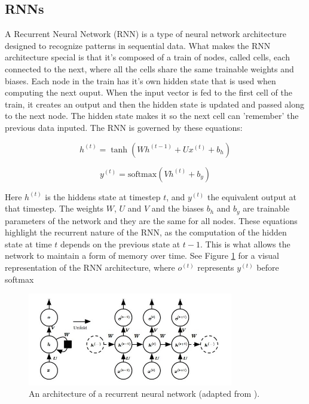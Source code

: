 \documentclass[11pt]{article}
\begin{document}
\subsection{RNNs}
A Recurrent Neural Network (RNN) is a type of neural network architecture designed to recognize patterns in sequential data. What makes the RNN architecture special is that it's composed of a train of nodes, called cells, each connected to the next, where all the cells share the same trainable weights and biases. Each node in the train has it's own hidden state that is used when computing the next ouput. When the input vector is fed to the first cell of the train, it creates an output and then the hidden state is updated and passed along to the next node. The hidden state makes it so the next cell can 'remember' the previous data inputed. The RNN is governed by these equations:

\begin{equation}
h^{(t)} = \tanh(Wh^{(t-1)} + Ux^{(t)} + b_h)
\end{equation}

\begin{equation}
y^{(t)} = \text{softmax}(Vh^{(t)} + b_y)
\end{equation}

Here \(h^{(t)}\) is the hiddens state at timestep $t$, and \(y^{(t)}\) the equivalent output at that timestep. The weights $W$, $U$ and $V$ and the biases $b_h$ and $b_y$ are trainable parameters of the network and they are the same for all nodes. These equations highlight the recurrent nature of the RNN, as the computation of the hidden state at time $t$ depends on the previous state at $t-1$. This is what allows the network to maintain a form of memory over time. See Figure \ref{fig:rnn_diagram} for a visual representation of the RNN architecture, where $o^{(t)}$ represents $y^{(t)}$ before softmax

\begin{figure}[h]
\centering
\includegraphics[width=0.8\textwidth]{rnn_diagram.jpeg}
\caption{An architecture of a recurrent neural network (adapted from \cite{Goodfellow-et-al-2016}).}
\label{fig:rnn_diagram}
\end{figure}
\end{document}
